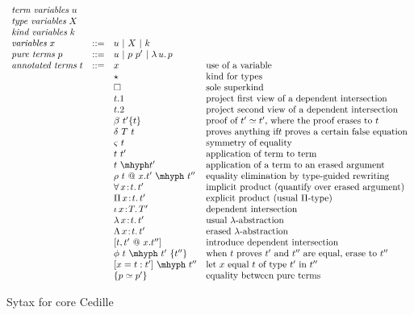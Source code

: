 \documentclass{article}
\newcommand{\abs}[4]{{#1}\, #2\! : \! #3.\, #4}
\newcommand{\absu}[3]{{#1}\, #2.\, #3}
\begin{document}
\begin{figure}
\[
\begin{array}{llll}
  \textit{term variables}\ u & \ & \ &\ \\
  \textit{type variables}\ X & \ & \ &\ \\
  \textit{kind variables}\ k & \ & \ &\ \\
  \textit{variables}\ x & ::= & u\ |\ X\ |\ k &\ \\  
  \textit{pure terms}\ p & ::= & u\ |\ p\ p'\ |\ \absu{\lambda}{u}{p} &\ \\
  \textit{annotated terms}\ t & ::= & x\ & \textnormal{use of a variable} \\
  \ &\ & \star&\textnormal{kind for types}\\
  \ &\ & \Box&\textnormal{sole superkind} \\
  \ &\ & t.1 & \textnormal{project first view of a dependent intersection}\\
  \ &\ & t.2 & \textnormal{project second view of a dependent intersection}\\
  \ &\ & \beta\ t'\{t\} &\textnormal{proof of }t' \simeq t'\textnormal{, where the proof erases to }t  \\
  \ &\ & \delta\ T\ t &\textnormal{proves anything if}t\textnormal{ proves a certain false equation}  \\
  \ &\ & \varsigma\ t &\textnormal{symmetry of equality}  \\
  \ &\ & t\ t' & \textnormal{application of term to term}\\
  \ &\ & t\ \mhyph t' & \textnormal{application of a term to an erased argument}\\
  \ &\ & \rho\ t\ @\ x.t'\ \mhyph\ t''&\textnormal{equality elimination by type-guided rewriting}  \\ 
  \ &\ & \abs{\forall}{x}{t}{t'}\ &\textnormal{implicit product (quantify over erased argument)} \\
  \ &\ & \abs{\Pi}{x}{t}{t'}\ &\textnormal{explicit product (usual }\Pi\textnormal{-type)} \\
  \ &\ & \abs{\iota}{x}{T}{T'}\ &\textnormal{dependent intersection} \\
  \ &\ & \abs{\lambda}{x}{t}{t'} & \textnormal{usual }\lambda\textnormal{-abstraction} \\
  \ &\ & \abs{\Lambda}{x}{t}{t'} & \textnormal{erased }\lambda\textnormal{-abstraction}\\
  \ &\ & [ t , t' \ @\ x.t'' ] & \textnormal{introduce dependent intersection}\\
  \ &\ & \phi\ t\ \mhyph\ t'\ \{t''\} & \textnormal{when }t\textnormal{ proves }t'\textnormal{ and }t''
                                   \textnormal{ are equal, erase to }t'' \\
  \ & \ & [ x = t : t' ]\ \mhyph\ t'' & \textnormal{let }x\textnormal{ equal }t\textnormal{ of type }t'\textnormal{ in }t'' \\
  \ &\ & \{ p \simeq p' \} &\textnormal{equality between pure terms}
\end{array}
  \]
  \caption{Sytax for core Cedille}
  \label{fig:syntax}
\end{figure}
\end{document}
